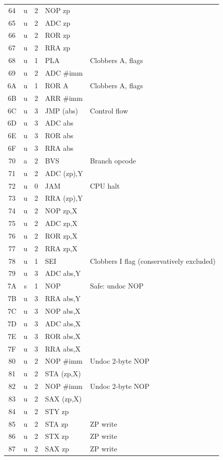 \documentclass{article}
\begin{document}
{\begin{longtable}{@{}ccclp{4.8cm}@{}}
64 & u  & 2 & NOP zp & \\
65 & u  & 2 & ADC zp & \\
66 & u  & 2 & ROR zp & \\
67 & u  & 2 & RRA zp & \\
68 & u  & 1 & PLA & Clobbers A, flags \\
69 & u  & 2 & ADC \#imm & \\
6A & u  & 1 & ROR A & Clobbers A, flags \\
6B & u  & 2 & ARR \#imm & \\
6C & u  & 3 & JMP (abs) & Control flow \\
6D & u  & 3 & ADC abs & \\
6E & u  & 3 & ROR abs & \\
6F & u  & 3 & RRA abs & \\
70 & a  & 2 & BVS & Branch opcode \\
71 & u  & 2 & ADC (zp),Y & \\
72 & u  & 0 & JAM & CPU halt \\
73 & u  & 2 & RRA (zp),Y & \\
74 & u  & 2 & NOP zp,X & \\
75 & u  & 2 & ADC zp,X & \\
76 & u  & 2 & ROR zp,X & \\
77 & u  & 2 & RRA zp,X & \\
78 & u  & 1 & SEI & Clobbers I flag (conservatively excluded) \\
79 & u  & 3 & ADC abs,Y & \\
7A & s  & 1 & NOP & Safe: undoc NOP \\
7B & u  & 3 & RRA abs,Y & \\
7C & u  & 3 & NOP abs,X & \\
7D & u  & 3 & ADC abs,X & \\
7E & u  & 3 & ROR abs,X & \\
7F & u  & 3 & RRA abs,X & \\
80 & u  & 2 & NOP \#imm & Undoc 2-byte NOP \\
81 & u  & 2 & STA (zp,X) & \\
82 & u  & 2 & NOP \#imm & Undoc 2-byte NOP \\
83 & u  & 2 & SAX (zp,X) & \\
84 & u  & 2 & STY zp & \\
85 & u  & 2 & STA zp & ZP write \\
86 & u  & 2 & STX zp & ZP write \\
87 & u  & 2 & SAX zp & ZP write \\

\end{longtable}}
\end{document}
